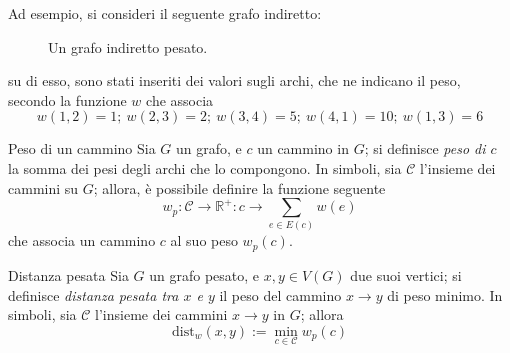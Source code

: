 \documentclass[a4paper, 12pt]{report}
\begin{document}
    \begin{example}
        Ad esempio, si consideri il seguente grafo indiretto:

        \begin{figure}[H]
            \centering
            \caption{Un grafo indiretto pesato.}
        \end{figure}

        su di esso, sono stati inseriti dei valori sugli archi, che ne indicano il peso, secondo la funzione $w$ che associa $$w(1, 2) = 1; \ w(2,3)=2; \ w(3, 4)=5; \ w(4, 1)=10; \ w(1,3)=6$$
    \end{example}

    \begin{frameddefn}{Peso di un cammino}
        Sia $G$ un grafo, e $c$ un cammino in $G$; si definisce \textit{peso di $c$} la somma dei pesi degli archi che lo compongono. In simboli, sia $\mathcal {C}$ l'insieme dei cammini su $G$; allora, è possibile definire la funzione seguente $$w_p : \mathcal{C} \rightarrow \mathbb{R}^+: c \rightarrow \displaystyle \sum_{e \in E(c)}{w(e)}$$ che associa un cammino $c$ al suo peso $w_p(c)$.
    \end{frameddefn}

    \begin{frameddefn}{Distanza pesata}
        Sia $G$ un grafo pesato, e $x, y \in V(G)$ due suoi vertici; si definisce \textit{distanza pesata tra $x$ e $y$} il peso del cammino $x \rightarrow y$ di peso minimo. In simboli, sia $\mathcal{C}$ l'insieme dei cammini $x \rightarrow y$ in $G$; allora $$\mathrm{dist}_w(x, y) := \min_{c \in \mathcal{C}}{w_p(c)}$$
    \end{frameddefn}
\end{document}
